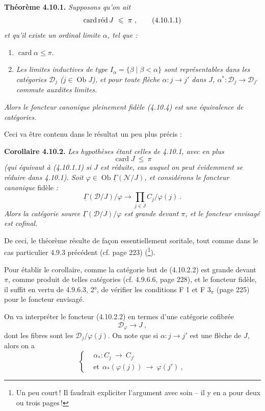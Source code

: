 \documentclass[11pt]{article}
\newcommand{\printedpage}[1]{\marginpar{\footnotesize p.~#1}}
\newcommand{\msp}[1]{\marginpar{\footnotesize [#1]}}
\newcommand{\uGamma}{\underline{\Gamma}}
\newcommand{\Ob}{\operatorname{Ob}}
\newcommand{\card}{\operatorname{card}}
\begin{document}
\printedpage{92}

\textbf{Théorème 4.10.1.} \textit{Supposons qu'on ait}
\[
\mathrm{card}\,\textup{réd}\, J \ \leqslant \ \pi \ , \tag*{(4.10.1.1)}
\]
\textit{et qu'il existe un ordinal limite $\alpha$, tel que :}
\begin{enumerate}[label={}, leftmargin=3em]
\item[\textit{1)}] $\card \alpha \leqslant \pi$.
\item[\textit{2)}] \textit{Les limites inductives de}
\msp{page 245}
\textit{type $I_\alpha = \{\beta \mid \beta < \alpha\}$ sont représentables dans les catégories $\mathcal{D}_j$ ($j \in \Ob J$), et pour toute flèche $\alpha : j \longrightarrow j'$ dans $J$, $\alpha^* : \mathcal{D}_j \longrightarrow \mathcal{D}_{j'}$ commute auxdites limites.}
\end{enumerate}
\textit{Alors le foncteur canonique pleinement fidèle (4.10.4) est une équivalence de catégories.}

Ceci va être contenu dans le résultat un peu plus précis :

\textbf{Corollaire 4.10.2.} \textit{Les hypothèses étant celles de 4.10.1, avec en plus}
\[
\card J \ \leqslant \ \pi \tag*{(4.10.2.1)}
\]
\textit{(qui équivaut à (4.10.1.1) si $J$ est réduite, cas auquel on peut évidemment se réduire dans 4.10.1). Soit $\varphi \in \Ob \uGamma(\mathcal{N}/J)$, et considérons le foncteur canonique} fidèle \textit{:}
\[
\uGamma(\mathcal{D}/J)/\varphi \longrightarrow \prod_{j\in J} C_j/\varphi(j) \ . \tag*{(4.10.2.2)}
\]
\textit{Alors la catégorie source $\uGamma(\mathcal{D}/J)/\varphi$ est grande devant $\pi$, et le foncteur envisagé est cofinal.}

\msp{page 246}
De ceci, le théorème résulte de façon essentiellement soritale, tout comme dans le cas particulier 4.9.3 précédent (cf. page 223) (\footnote{Un peu court\,! Il faudrait expliciter l'argument avec soin – il y en a pour deux ou trois pages\,!}).

Pour établir le corollaire, comme la catégorie but de (4.10.2.2) est grande devant $\pi$, comme produit de telles catégories (cf. 4.9.6.6, page 228), et le foncteur fidèle, il suffit en vertu de 4.9.6.3, 2°, de vérifier les conditions F 1 et F 3$_\pi$ (page 225) pour le foncteur envisagé.

On va interpréter le foncteur (4.10.2.2) en termes d'une catégorie cofibrée
\[
\mathcal{D}_\varphi \longrightarrow J \ , \tag*{(4.10.5)}
\]
dont les fibres sont les $\mathcal{D}_j/\varphi(j)$. On note que si $\alpha : j \longrightarrow j'$ est une flèche de $J$, alors on a
\[
\left\{
\begin{aligned}
&\alpha_* : C_j \ \longrightarrow \ C_{j'} \\
&\text{et} \ \ \alpha_*(\varphi(j)) \ \longrightarrow \ \varphi(j') \ ,
\end{aligned}
\right.
\]
\end{document}
